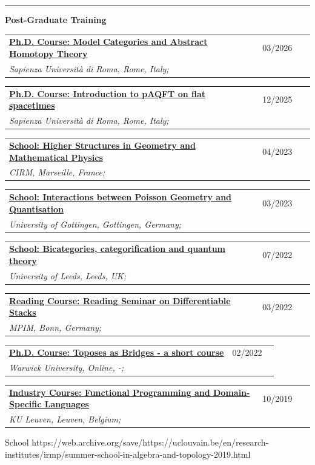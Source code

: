 \documentclass[a4paper]{article}
\newcommand{\block}[1]{\hrule \vspace{0.2cm} \textbf{\Large #1} \vspace{0.2cm}}
\newcommand{\longvoice}[8]{
    \begin{tabular}{p{0.83\linewidth} p{0.17\linewidth} }
        \textbf{\href{#3}{#2: #1}} & #4 
        \\ 
        \textit{#5, #6, #7;} & {\small\emph{#8}}
    \end{tabular}
    \vspace{.5em}
}
\begin{document}


    \block{Post-Graduate Training}

    
    \longvoice{Model Categories and Abstract Homotopy Theory}
        {Ph.D. Course}
        {https://eugeniolandi.github.io/homotopy}
        {03/2026}
        {Sapienza Università di Roma}
        {Rome}
        {Italy}
        {}
    \longvoice{Introduction to pAQFT on flat spacetimes}
        {Ph.D. Course}
        {https://www.antoniomiti.it/teaching/aqft-2025/}
        {12/2025}
        {Sapienza Università di Roma}
        {Rome}
        {Italy}
        {}
    \longvoice{Higher Structures in Geometry and Mathematical Physics}
        {School}
        {https://conferences.cirm-math.fr/2697.html}
        {04/2023}
        {CIRM}
        {Marseille}
        {France}
        {}
    \longvoice{Interactions between Poisson Geometry and Quantisation}
        {School}
        {https://sites.google.com/view/poissonquantisation2023}
        {03/2023}
        {University of Gottingen}
        {Gottingen}
        {Germany}
        {}
    \longvoice{Bicategories, categorification and quantum theory}
        {School}
        {https://conferences.leeds.ac.uk/bcqt2022/}
        {07/2022}
        {University of Leeds}
        {Leeds}
        {UK}
        {}
    \longvoice{Reading Seminar on Differentiable Stacks}
        {Reading Course}
        {https://www.dropbox.com/s/a9tmw4g8m58ymkf/2203-Bonn-StackReadingSeminar.pdf?dl=0}
        {03/2022}
        {MPIM}
        {Bonn}
        {Germany}
        {}
    \longvoice{Toposes as Bridges - a short course}
        {Ph.D. Course}
        {https://warwick.ac.uk/fac/sci/maths/research/events/events2021-22/toposesasbridges/}
        {02/2022}
        {Warwick University}
        {Online}
        {-}
        {}
    \longvoice{Functional Programming and Domain-Specific Languages}
        {Industry Course}
        {https://dtai.cs.kuleuven.be/events/fpcourse/}
        {10/2019}
        {KU Leuven}
        {Leuven}
        {Belgium}
        {}
        {School}
        {https://web.archive.org/save/https://uclouvain.be/en/research-institutes/irmp/summer-school-in-algebra-and-topology-2019.html}
\end{document}
